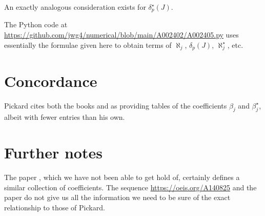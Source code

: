 \documentclass{article}
\begin{document}
An exactly analogous consideration exists for $\delta^{\star}_p(J)$.

The Python code at \url{https://github.com/jwg4/numerical/blob/main/A002402/A002405.py} uses essentially the formulae given here to obtain terms of $\aleph_j$, $\delta_p(J)$, $\aleph^{\star}_j$, etc.

\section{Concordance}
Pickard cites both the books \cite{collatz} and \cite{henrici} as providing tables of the coefficients $\beta_j$ and $\beta^{\star}_j$, albeit with fewer entries than his own.

\section{Further notes}
The paper \cite{curtz}, which we have not been able to get hold of, certainly defines a similar collection of coefficients. The sequence \url{https://oeis.org/A140825} and the paper \cite{flajolet} do not give us all the information we need to be sure of the exact relationship to those of Pickard.




\end{document}
